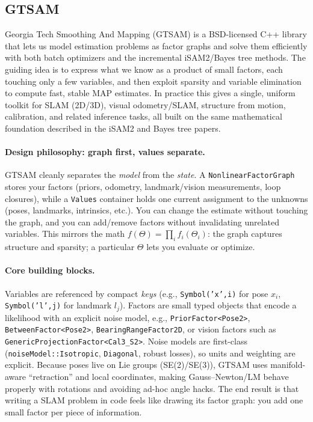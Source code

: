 \subsection{GTSAM}
Georgia Tech Smoothing And Mapping (GTSAM) is a BSD-licensed C++ library that lets us model estimation problems as factor graphs and solve them efficiently with both batch optimizers and the incremental iSAM2/Bayes tree methods. The guiding idea is to express what we know as a product of small factors, each touching only a few variables, and then exploit sparsity and variable elimination to compute fast, stable MAP estimates. In practice this gives a single, uniform toolkit for SLAM (2D/3D), visual odometry/SLAM, structure from motion, calibration, and related inference tasks, all built on the same mathematical foundation described in the iSAM2 and Bayes tree papers\cite{GTSAM_handbook,iSAM2_paper,Bayes_tree_for_SLAM_paper}.

\paragraph{Design philosophy: graph first, values separate.}
GTSAM cleanly separates the \emph{model} from the \emph{state}. A \texttt{NonlinearFactorGraph} stores your factors (priors, odometry, landmark/vision measurements, loop closures), while a \texttt{Values} container holds one current assignment to the unknowns (poses, landmarks, intrinsics, etc.). You can change the estimate without touching the graph, and you can add/remove factors without invalidating unrelated variables. This mirrors the math \(f(\Theta)=\prod_i f_i(\Theta_i)\): the graph captures structure and sparsity; a particular \(\Theta\) lets you evaluate or optimize. \cite{GTSAM_handbook}

\paragraph{Core building blocks.}
Variables are referenced by compact \emph{keys} (e.g., \texttt{Symbol('x',i)} for pose \(x_i\), \texttt{Symbol('l',j)} for landmark \(l_j\)). Factors are small typed objects that encode a likelihood with an explicit noise model, e.g., \texttt{PriorFactor<Pose2>}, \texttt{BetweenFactor<Pose2>}, \texttt{BearingRangeFactor2D}, or vision factors such as \texttt{GenericProjectionFactor<Cal3\_S2>}. Noise models are first-class (\texttt{noiseModel::Isotropic}, \texttt{Diagonal}, robust losses), so units and weighting are explicit. Because poses live on Lie groups (SE(2)/SE(3)), GTSAM uses manifold-aware “retraction” and local coordinates, making Gauss–Newton/LM behave properly with rotations and avoiding ad-hoc angle hacks. The end result is that writing a SLAM problem in code feels like drawing its factor graph: you add one small factor per piece of information. \cite{GTSAM_handbook}


